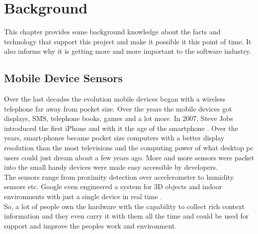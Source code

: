 \chapter{Background}

This chapter provides some background knowledge about the facts and technology that support this project and make it possible it this point of time. It also informs why it is getting more and more important to the software industry.

\section{Mobile Device Sensors}
Over the last decades the evolution mobile devices began with a wireless telephone far away from pocket size. Over the years the mobile devices got displays, SMS, telephone books, games and a lot more. In 2007, Steve Jobs introduced the first iPhone and with it the age of the smartphone  \cite{laugesen2010factors}. Over the years, smart-phones became pocket size computers with a better display resolution than the most televisions and the computing power of what desktop pc users could just dream about a few years ago. More and more sensors were packet into the small handy devices were made easy accessible by developers.\\
The sensors range from proximity detection over accelerometer to humidity sensors etc. Google even engineered a system for 3D objects and indoor environments with just a single device in real time \cite{schops20153d}.\\
So, a lot of people own the hardware with the capability to collect rich context information and they even carry it with them all the time and could be used for support and improve the peoples work and environment.

